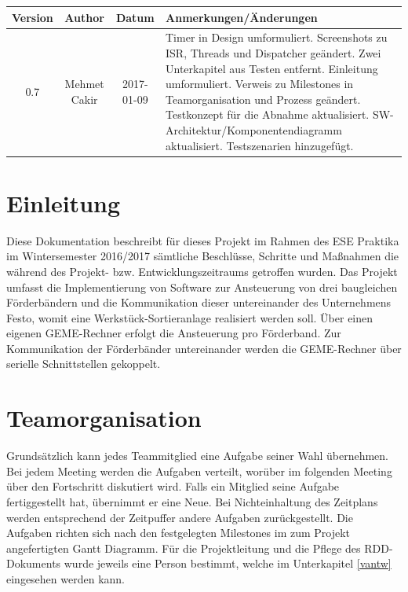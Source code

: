 \documentclass[a4paper, 11pt]{article}
\begin{document}
\newpage

\begin{table}[H]
    \begin{tabularx}{\textwidth}{|c|c|c|X|}
    \hline
    \textbf{Version} & \textbf{Author} & \textbf{Datum} & \centering \arraybackslash \textbf{Anmerkungen/Änderungen}\\
    \hline
    0.7&Mehmet Cakir&2017-01-09&Timer in Design umformuliert. Screenshots zu ISR, Threads und Dispatcher geändert. Zwei Unterkapitel aus Testen entfernt. Einleitung umformuliert. Verweis zu Milestones in Teamorganisation und Prozess geändert. Testkonzept für die Abnahme aktualisiert. SW-Architektur/Komponentendiagramm aktualisiert. Testszenarien hinzugefügt.\\
    \hline
    \end{tabularx}
\label{changes}
\end{table}

\newpage

\tableofcontents

\newpage

\section{Einleitung}
Diese Dokumentation beschreibt für dieses Projekt im Rahmen des ESE Praktika im Wintersemester 2016/2017 sämtliche Beschlüsse, Schritte und Maßnahmen die während des Projekt- bzw. Entwicklungszeitraums getroffen wurden. Das Projekt umfasst die Implementierung von Software zur Ansteuerung von drei baugleichen Förderbändern und die Kommunikation dieser untereinander des Unternehmens Festo, womit eine Werkstück-Sortieranlage realisiert werden soll. Über einen eigenen GEME-Rechner erfolgt die Ansteuerung pro Förderband. Zur Kommunikation der Förderbänder untereinander werden die GEME-Rechner über serielle Schnittstellen gekoppelt.

\section{Teamorganisation}
Grundsätzlich kann jedes Teammitglied eine Aufgabe seiner Wahl übernehmen. Bei jedem Meeting werden die Aufgaben verteilt, worüber im folgenden Meeting über den Fortschritt diskutiert wird. Falls ein Mitglied seine Aufgabe fertiggestellt hat, übernimmt er eine Neue. Bei Nichteinhaltung des Zeitplans werden entsprechend der Zeitpuffer andere Aufgaben zurückgestellt. Die Aufgaben richten sich nach den festgelegten Milestones im zum Projekt angefertigten Gantt Diagramm. Für die Projektleitung und die Pflege des RDD-Dokuments wurde jeweils eine Person bestimmt, welche im Unterkapitel \ref{vantw} eingesehen werden kann.
\end{document}
